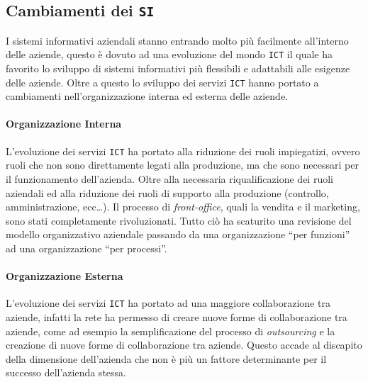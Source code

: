     \subsection{Cambiamenti dei \texttt{SI}}
        I sistemi informativi aziendali stanno entrando molto più facilmente all'interno delle aziende, questo è dovuto ad una evoluzione del mondo \texttt{ICT} il quale ha favorito lo sviluppo di sistemi informativi più flessibili e adattabili alle esigenze delle aziende.\newline
        Oltre a questo lo sviluppo dei servizi \texttt{ICT} hanno portato a cambiamenti nell'organizzazione interna ed esterna delle aziende.
        \paragraph{Organizzazione Interna} L'evoluzione dei servizi \texttt{ICT} ha portato alla riduzione dei ruoli impiegatizi, ovvero ruoli che non sono direttamente legati alla produzione, ma che sono necessari per il funzionamento dell'azienda. Oltre alla necessaria riqualificazione dei ruoli aziendali ed alla riduzione dei ruoli di supporto alla produzione (controllo, amministrazione, ecc\dots). Il processo di \textit{front-office}, quali la vendita e il marketing, sono stati completamente rivoluzionati. Tutto ciò ha scaturito una revisione del modello organizzativo aziendale passando da una organizzazione ``per funzioni'' ad una organizzazione ``per processi''. 
        \paragraph{Organizzazione Esterna} L'evoluzione dei servizi \texttt{ICT} ha portato ad una maggiore collaborazione tra aziende, infatti la rete ha permesso di creare nuove forme di collaborazione tra aziende, come ad esempio la semplificazione del processo di \textit{outsourcing} e la creazione di nuove forme di collaborazione tra aziende. Questo accade al discapito della dimensione dell'azienda che non è più un fattore determinante per il successo dell'azienda stessa.